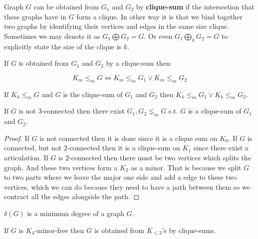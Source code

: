 \begin{defn}
	Graph $G$ can be obtained from $G_{1}$ and $G_{2}$ by \textbf{clique-sum} if the intersection that these graphs have in $G$ form a clique. In other way it is that we bind together two graphs by identifying their vertices and edges in the same size clique. Sometimes we may denote it as $G_{1} \bigoplus G_{2} = G$. Or even $G_{1} \bigoplus_k G_{2} = G$ to explicitly state the size of the clique is $k$.
\end{defn}

\begin{observ}
	If $G$ is obtained from $G_{1}$ and $G_{2}$ by a clique-sum then:
	
	$$
	K_{m} \leq_{m} G \Leftrightarrow K_{m} \leq_{m} G_{1} \lor K_{m} \leq_{m} G_{2}
	$$
\end{observ}

\begin{lemma}
	If $K_{k} \leq_{m} G$ and $G$ is the clique-sum of $G_{1}$ and $G_{2}$ then $K_{k} \leq_{m} G_{1} \lor K_{k} \leq_{m} G_{2}$.
\end{lemma}

\begin{lemma}
	If $G$ is not $3$-connected then there exist $G_{1}, G_{2} \lneq_{m} G$ s.t. $G$ is a clique-sum of $G_{1}$ and $G_{2}$.
\end{lemma}

\begin{proof}
	If $G$ is not connected then it is done since it is a clique sum on $K_{0}$. If $G$ is connected, but not $2$-connected then it is a clique-sum on $K_{1}$ since there exist a articulation. If $G$ is $2$-connected then there must be two vertices which splits the graph. And these two vertices form a $K_{2}$ as a minor. That is because we split $G$ to two parts where we leave the major one side and add a edge to these two vertices, which we can do because they need to have a path between them so we contract all the edges alongside the path.
\end{proof}

\begin{defn}
	$\delta(G)$ is a minimum degree of a graph $G$.
\end{defn}

\begin{thm}
	If $G$ is $K_{4}$-minor-free then $G$ is obtained from $K_{\leq 3}$'s by clique-sums.
\end{thm}

